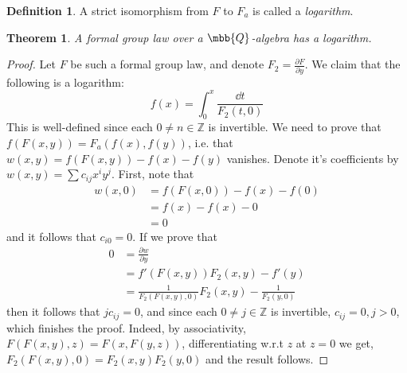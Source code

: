 \documentclass{article}
\newtheorem*{theorem*}{Theorem}
\theoremstyle{definition}
\newtheorem*{definition*}{Definition}
\theoremstyle{remark}
\begin{document}
	\begin{definition*}
		A strict isomorphism from $F$ to $F_a$ is called a \emph{logarithm}.
	\end{definition*}

	\begin{theorem*}
		A formal group law over a $\mbb{Q}$-algebra has a logarithm.
	\end{theorem*}

	\begin{proof}
		Let $F$ be such a formal group law, and denote $F_2 = \frac{\partial F}{\partial y}$.
		We claim that the following is a logarithm:
		$$ f\left(x\right) = \int_0^x \frac{\dd{t}}{F_2\left(t,0\right)} $$
		This is well-defined since each $0 \neq n \in \mathbb{Z}$ is invertible.
		We need to prove that
		$f\left(F\left(x,y\right)\right) = F_a\left(f\left(x\right),f\left(y\right)\right)$,
		i.e. that
		$w\left(x,y\right) = f\left(F\left(x,y\right)\right) - f\left(x\right) - f\left(y\right)$ vanishes.
		Denote it's coefficients by $w\left(x,y\right) = \sum c_{ij} x^i y^j$.
		First, note that
		\begin{align*}
			w\left(x,0\right)
			&= f\left(F\left(x,0\right)\right) - f\left(x\right) - f\left(0\right)\\
			&= f\left(x\right) - f\left(x\right) - 0\\
			&= 0
		\end{align*}
		and it follows that $c_{i0} = 0$.
		If we prove that
		\begin{align*}
			0
			&= \frac{\partial w}{\partial y}\\
			&= f'\left(F\left(x,y\right)\right) F_2\left(x,y\right) - f'\left(y\right)\\
			&= \frac{1}{F_2\left(F\left(x,y\right),0\right)} F_2\left(x,y\right) - \frac{1}{F_2\left(y,0\right)}
		\end{align*}
		then it follows that $j c_{ij} = 0$, and since each $0 \neq j \in \mathbb{Z}$ is invertible, $c_{ij} = 0, j > 0$, which finishes the proof.
		Indeed, by associativity,
		$F\left(F\left(x,y\right),z\right)=F\left(x,F\left(y,z\right)\right)$, differentiating w.r.t $z$ at $z=0$ we get,
		$
			F_2\left(F\left(x,y\right),0\right)
			= F_2\left(x,y\right) F_2\left(y,0\right)
		$
		and the result follows.
	\end{proof}
\end{document}
